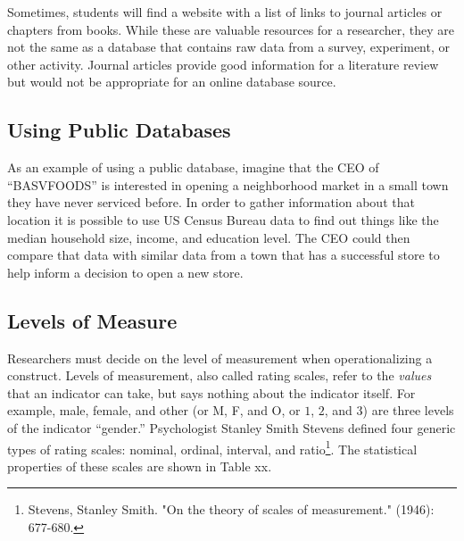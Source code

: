 Sometimes, students will find a website with a list of links to journal articles or chapters from books. While these are valuable resources for a researcher, they are not the same as a database that contains raw data from a survey, experiment, or other activity. Journal articles provide good information for a literature review but would not be appropriate for an online database source.

\subsection{Using Public Databases}

As an example of using a public database, imagine that the CEO of ``BASVFOODS'' is interested in opening a neighborhood market in a small town they have never serviced before. In order to gather information about that location it is possible to use US Census Bureau data to find out things like the median household size, income, and education level. The CEO could then compare that data with similar data from a town that has a successful store to help inform a decision to open a new store.


\subsection{Levels of Measure}

Researchers must decide on the level of measurement when operationalizing a construct. Levels of measurement, also called rating scales, refer to the \textit{values} that an indicator can take, but says nothing about the indicator itself. For example, male, female, and other (or M, F, and O, or $ 1 $, $ 2 $, and $ 3 $) are three levels of the indicator ``gender.'' Psychologist Stanley Smith Stevens defined four generic types of rating scales: nominal, ordinal, interval, and ratio\footnote{Stevens, Stanley Smith. "On the theory of scales of measurement." (1946): 677-680.}. The statistical properties of these scales are shown in Table xx.


